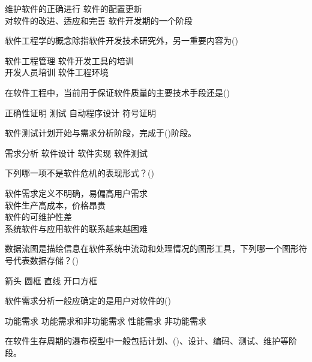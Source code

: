 \documentclass{exam}
\begin{document}
\begin{questions}
	\begin{oneparchoices}
		\choice 维护软件的正确进行
		\choice 软件的配置更新\\
		\correctchoice 对软件的改进、适应和完善
		\choice 软件开发期的一个阶段
	\end{oneparchoices}
	\question 软件工程学的概念除指软件开发技术研究外，另一重要内容为()\\
	\begin{oneparchoices}
		\correctchoice 软件工程管理
		\choice 软件开发工具的培训\\
		\choice 开发人员培训
		\choice 软件工程环境
	\end{oneparchoices}
	\question 在软件工程中，当前用于保证软件质量的主要技术手段还是()\\
	\begin{oneparchoices}
		\choice 正确性证明
		\correctchoice 测试
		\choice 自动程序设计
		\choice 符号证明
	\end{oneparchoices}
	\question 软件测试计划开始与需求分析阶段，完成于()阶段。\\
	\begin{oneparchoices}
		\choice 需求分析
		\choice 软件设计
		\choice 软件实现
		\correctchoice 软件测试
	\end{oneparchoices}
	\question 下列哪一项不是软件危机的表现形式？()\\
	\begin{oneparchoices}
		\choice 软件需求定义不明确，易偏高用户需求\\
		\choice 软件生产高成本，价格昂贵\\
		\choice 软件的可维护性差\\
		\correctchoice 系统软件与应用软件的联系越来越困难
	\end{oneparchoices}
	\question 数据流图是描绘信息在软件系统中流动和处理情况的图形工具，下列哪一个图形符号代表数据存储？()\\
	\begin{oneparchoices}
		\choice 箭头
		\choice 圆框
		\choice 直线
		\correctchoice 开口方框
	\end{oneparchoices}
	\question 软件需求分析一般应确定的是用户对软件的()\\
	\begin{oneparchoices}
		\choice 功能需求
		\correctchoice 功能需求和非功能需求
		\choice 性能需求
		\choice 非功能需求
	\end{oneparchoices}
	\question 在软件生存周期的瀑布模型中一般包括计划、()、设计、编码、测试、维护等阶段。\\
	\begin{oneparchoices}

\end{oneparchoices}
\end{questions}
\end{document}
